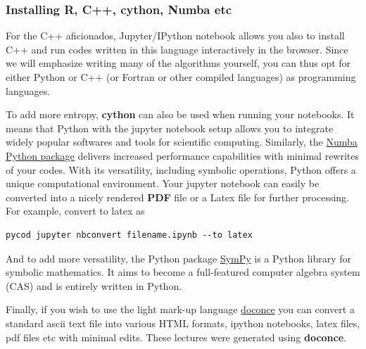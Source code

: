 \documentclass{beamer}
\newcounter{doconce:movie:counter}
\begin{document}
\begin{frame}
\frametitle{Installing R, C++, cython, Numba etc}

For the C++ aficionados, Jupyter/IPython notebook allows you also to
install C++ and run codes written in this language interactively in
the browser. Since we will emphasize writing many of the algorithms
yourself, you can thus opt for either Python or C++ (or Fortran or other compiled languages) as programming
languages.

To add more entropy, \textbf{cython} can also be used when running your
notebooks. It means that Python with the jupyter notebook
setup allows you to integrate widely popular softwares and tools for
scientific computing. Similarly, the 
\href{{https://numba.pydata.org/}}{Numba Python package} delivers increased performance
capabilities with minimal rewrites of your codes.  With its
versatility, including symbolic operations, Python offers a unique
computational environment. Your jupyter notebook can easily be
converted into a nicely rendered \textbf{PDF} file or a Latex file for
further processing. For example, convert to latex as 



\begin{verbatim}
pycod jupyter nbconvert filename.ipynb --to latex 

\end{verbatim}


And to add more versatility, the Python package \href{{http://www.sympy.org/en/index.html}}{SymPy} is a Python library for symbolic mathematics. It aims to become a full-featured computer algebra system (CAS)  and is entirely written in Python. 

Finally, if you wish to use the light mark-up language 
\href{{https://github.com/hplgit/doconce}}{doconce} you can convert a standard ascii text file into various HTML 
formats, ipython notebooks, latex files, pdf files etc with minimal edits. These lectures were generated using \textbf{doconce}.
\end{frame}
\end{document}
